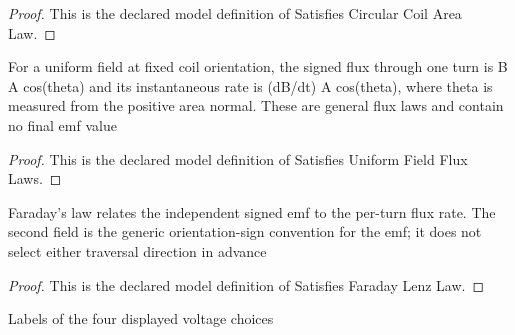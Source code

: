 \begin{proof}
  This is the declared model definition of Satisfies Circular Coil Area Law.
\end{proof}
\begin{definition}
  \label{def:physics:phyx-mini-0936:phyxminiproblems-problemphyxmini0936-satisfiesuniformfieldfluxlaws}
  For a uniform field at fixed coil orientation, the signed flux through one turn is B A cos(theta) and its instantaneous rate is (dB/dt) A cos(theta), where theta is measured from the positive area normal. These are general flux laws and contain no final emf value
\end{definition}
\begin{proof}
  This is the declared model definition of Satisfies Uniform Field Flux Laws.
\end{proof}
\begin{definition}
  \label{def:physics:phyx-mini-0936:phyxminiproblems-problemphyxmini0936-satisfiesfaradaylenzlaw}
  Faraday's law relates the independent signed emf to the per-turn flux rate. The second field is the generic orientation-sign convention for the emf; it does not select either traversal direction in advance
\end{definition}
\begin{proof}
  This is the declared model definition of Satisfies Faraday Lenz Law.
\end{proof}
\begin{definition}
  \label{def:physics:phyx-mini-0936:phyxminiproblems-problemphyxmini0936-answerchoice}
  Labels of the four displayed voltage choices
\end{definition}
